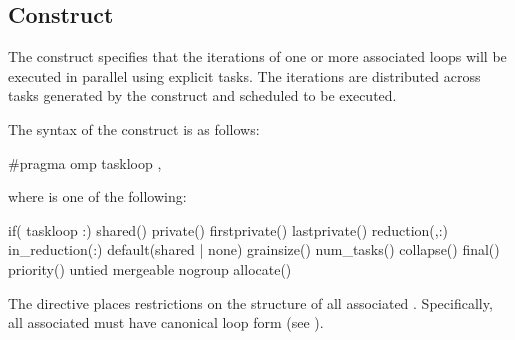 \subsection{ Construct}
\label{subsec:taskloop Construct}
\summary
The  construct specifies that the iterations of one or more associated loops will be executed in parallel using explicit tasks. The iterations are distributed across tasks generated by the construct and scheduled to be executed.
\syntax
\begin{ccppspecific}
The syntax of the  construct is as follows:
\begin{ompcPragma}
#pragma omp taskloop \plc{[clause[[},\plc{] clause] ...] new-line}
\end{ompcPragma}
where  is one of the following:
\begin{indentedcodelist}
if(\plc{[} taskloop :\plc{] scalar-expr})
shared()
private()
firstprivate()
lastprivate()
reduction(\plc{[ reduction-modifier},\plc{]reduction-identifier }:)
in_reduction(:)
default(shared \textnormal{|} none)
grainsize()
num_tasks()
collapse()
final()
priority()
untied
mergeable
nogroup
allocate(\plc{[allocator: ]})
\end{indentedcodelist}

The  directive places restrictions on the structure of all associated . Specifically, all associated  must have canonical loop form (see ).
\end{ccppspecific}
